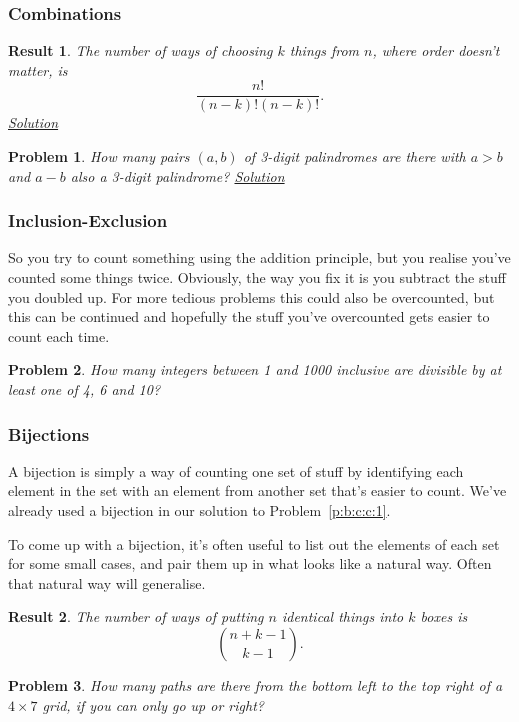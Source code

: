 \documentclass{amsart}
\newtheorem{problem}{Problem}[subsubsection]
\newtheorem{result}{Result}[subsubsection]
\begin{document}
\subsubsection{Combinations}
\begin{result}\label{r:b:c:c:1}
  The number of ways of choosing $k$ things from $n$, where order doesn't
  matter, is \[\frac{n!}{(n-k)!(n-k)!}.\]
  \hyperlink{sr:b:c:c:1}{Solution}
\end{result}
\begin{problem}{\label{p:b:c:c:1}}
  How many pairs $(a,b)$ of 3-digit palindromes are there with $a>b$ and
  $a-b$ also a 3-digit palindrome?
  \hyperlink{sp:b:c:c:1}{Solution}
\end{problem}
\subsubsection{Inclusion-Exclusion}
So you try to count something using the addition principle, but you realise
you've counted some things twice. Obviously, the way you fix it is you subtract
the stuff you doubled up. For more tedious problems this could also be
overcounted, but this can be continued and hopefully the stuff you've
overcounted gets easier to count each time.
\begin{problem}{\label{p:b:c:pie:1}}
  How many integers between 1 and 1000 inclusive are divisible by at least one
  of 4, 6 and 10?
\end{problem}
\subsubsection{Bijections}
A bijection is simply a way of counting one set of stuff by identifying each
element in the set with an element from another set that's easier to count.
We've already used a bijection in our solution to Problem~\ref{p:b:c:c:1}.

To come up with a bijection, it's often useful to list out the elements of each
set for some small cases, and pair them up in what looks like a natural way.
Often that natural way will generalise.

\begin{result}{\label{r:b:c:b:1}}
  The number of ways of putting $n$ identical things into $k$ boxes is
  \[\binom{n+k-1}{k-1}.\]
\end{result}
\begin{problem}{\label{p:b:c:b:1}}
  How many paths are there from the bottom left to the top right of a $4\times
  7$ grid, if you can only go up or right?
\end{problem}
\end{document}
